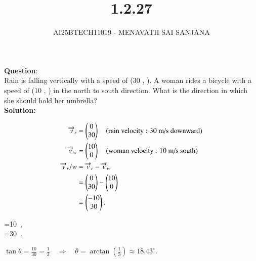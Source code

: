 \documentclass[journal]{IEEEtran}
\begin{document}

\vspace{3cm}

\title{1.2.27}
\author{AI25BTECH11019 - MENAVATH SAI SANJANA}
{\let\newpage\relax\maketitle}

\renewcommand{\thefigure}{\theenumi}
\renewcommand{\thetable}{\theenumi}
\setlength{\intextsep}{10pt} %


\renewcommand{\thetable}{\theenumi}

\textbf{Question}:\\
  Rain is falling vertically with a speed of (30 , ). A woman rides a bicycle with a speed of (10 , ) in the north to south direction. What is the direction in which she should hold her umbrella?
\\
\bigskip
\textbf{Solution: }


\begin{align}
\overrightarrow{v}_r&= \myvec{0\\30}\quad\text{(rain velocity : }30\ \text{m/s}\text{ downward)}\\
\overrightarrow{v}_w &= \myvec{10\\0}\quad\text{(woman velocity : }10\ \text{m/s}\text{ south)}\\
\overrightarrow{v}_r/w &= \overrightarrow{v}_r - \overrightarrow{v}_w \\
&= \myvec{0\\30}-\myvec{10\\0} \\
&= \myvec{-10\\30}.
\end{align}

\vspace{1cm}

=10\ ,\qquad \\
=30\ .\qquad
 
$
\tan\theta=\frac{10}{30}=\frac{1}{3}\quad\Rightarrow\quad
\theta=\arctan\!\left(\tfrac{1}{3}\right)\approx18.43^\circ.
$
\vspace{1cm}
\end{document}
